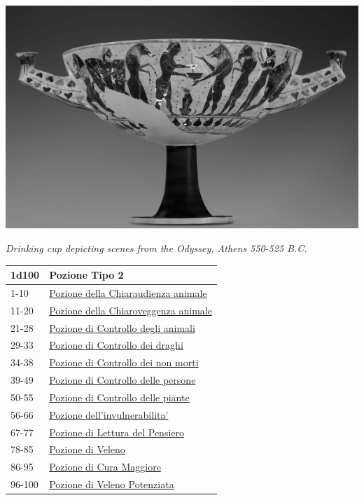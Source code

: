 \begin{multicols}{2}
{\begin{center}
\includegraphics[width=0.8\linewidth]{immagini/cupdrinking.png}

\emph{Drinking cup depicting scenes from the Odyssey, Athens 550-525 B.C.}
\end{center}
\hypertarget{Pozione Tipo 2}{}
{\small\begin{tabularx}{\linewidth}{ll}
		\toprule
\textbf{1d100} & \textbf{Pozione Tipo 2}\\
\toprule
1-10 & \hyperlink{Pozione della Chiaraudienzaa nimale}{Pozione della Chiaraudienza animale}\\
11-20 & \hyperlink{Pozione della Chiaroveggenza animale}{Pozione della Chiaroveggenza animale}\\
21-28 & \hyperlink{Pozione di Controllo degli animali}{Pozione di Controllo degli animali}\\
29-33 & \hyperlink{Pozione di Controllo dei draghi}{Pozione di Controllo dei draghi}\\
34-38 & \hyperlink{Pozione di Controllo dei nonmorti}{Pozione di Controllo dei non morti}\\
39-49 & \hyperlink{Pozione di Controllo delle persone}{Pozione di Controllo delle persone}\\
50-55 & \hyperlink{Pozione di Controllo delle piante}{Pozione di Controllo delle piante}\\
56-66 & \hyperlink{Pozione dell'invulnerabilita'}{Pozione dell'invulnerabilita'}\\
67-77 & \hyperlink{Pozione di Letturadel Pensiero}{Pozione di Lettura del Pensiero}\\
78-85 & \hyperlink{Pozione di Veleno}{Pozione di Veleno}\\
86-95 & \hyperlink{pozionifiltri}{Pozione di Cura Maggiore}\\
96-100 & \hyperlink{pozionifiltri}{Pozione di Veleno Potenziata}
\end{tabularx}}

}
\end{multicols}
